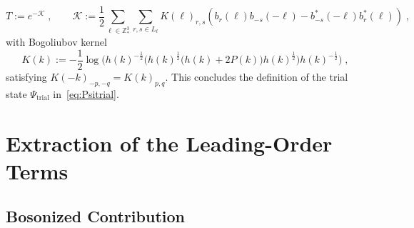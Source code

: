 \documentclass[12pt,a4paper]{article}
\numberwithin{equation}{section}
\newcommand{\cK}{\mathcal{K}}
\newcommand{\1}{\mathbb{I}}
\newcommand{\trial}{\mathrm{trial}}
\theoremstyle{plain}
\theoremstyle{definition}
\theoremstyle{remark}
\theoremstyle{plain}
\theoremstyle{definition}
\theoremstyle{remark}
\begin{document}
\begin{equation} \label{eq:T}
	T := e^{-\cK} \;, \qquad
	\cK := \frac{1}{2}\sum\limits_{\ell\in \mathbb{Z}^3_*}\sum\limits_{r,s\in L_\ell}K(\ell)_{r,s}\left(b_r(\ell)b_{-s}(-\ell)-b^*_{-s}(-\ell)b^*_{r}(\ell)\right) \;,
\end{equation}
with Bogoliubov kernel
\begin{equation} \label{eq:K}
	K(k) := - \frac 12 \log \Big( h(k)^{-\frac 12} \big( h(k)^{\frac 12} \big( h(k) + 2 P(k) \big) h(k)^{\frac 12}\big) h(k)^{-\frac 12} \Big) \;,
\end{equation}
satisfying $ K(-k)_{-p,-q} = K(k)_{p,q} $. This concludes the definition of the trial state $ \Psi_{\trial} $ in~\eqref{eq:Psitrial}.









\section{Extraction of the Leading-Order Terms}\label{sec:extraction}

\subsection{Bosonized Contribution}
\label{sec:extraction_bos}
\end{document}
